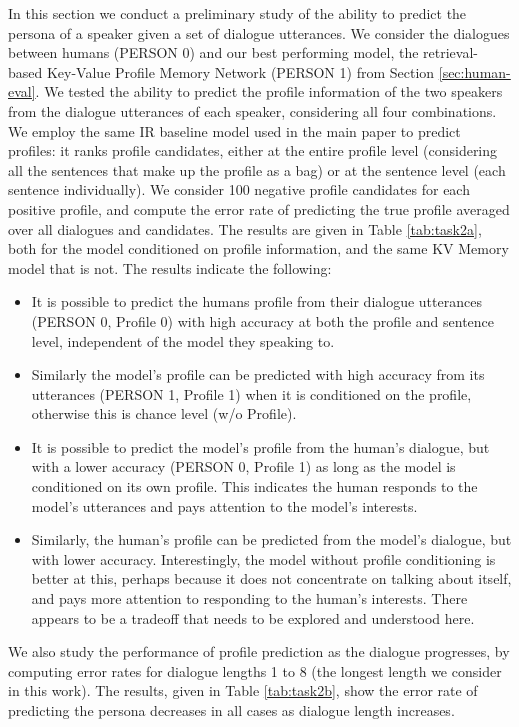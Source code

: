 \documentclass[11pt,a4paper]{article}
\begin{document}
In this section we conduct a preliminary study of the ability to predict the persona
of a speaker given a set of dialogue utterances. 
We consider the dialogues between humans (PERSON 0)  and our best performing model, the retrieval-based Key-Value Profile Memory Network (PERSON 1) from Section \ref{sec:human-eval}. We tested the ability to predict the profile information of the two speakers from the dialogue
utterances of each speaker, considering all four combinations.
We employ the same 
IR baseline model used in the main paper to predict profiles: it ranks profile candidates, either at the entire profile level (considering all the sentences that make up the profile as a bag) or at the  sentence level (each  sentence individually). 
We consider 100 negative profile candidates for each positive profile, and compute the error rate of
predicting the true profile averaged over all dialogues and candidates.
The results are given in Table \ref{tab:task2a},  both for the model conditioned on profile information, and the same KV Memory model that is not.
The results indicate the following:
\begin{itemize}
\item It is possible to predict the humans profile from their dialogue utterances
(PERSON 0, Profile 0) with high accuracy at both the profile and sentence level, independent of the model they speaking to.
\item Similarly the model's profile can be predicted with high accuracy from its utterances (PERSON 1, Profile 1) when it is conditioned on the profile, otherwise this is chance level (w/o Profile).
\item It is possible to predict the model's profile from the human's dialogue, but with a lower accuracy (PERSON 0, Profile 1) as long as the model is conditioned on its own profile. This indicates the human responds to the model's utterances and pays attention to the model's interests. 
\item Similarly, the human's profile can be predicted from the model's dialogue, but with lower accuracy. Interestingly, the model without profile conditioning is better at this, perhaps because it does not concentrate on talking about itself, and pays more attention to responding to the human's interests. There appears to be a tradeoff that needs to be explored and understood here.
\end{itemize}

We also study the performance of profile prediction as the dialogue progresses, by computing error
rates for dialogue lengths 1 to 8 (the longest length we consider in this work). 
The results, given in Table \ref{tab:task2b}, show the error rate of predicting the persona 
decreases in all cases as dialogue length increases.
\end{document}
